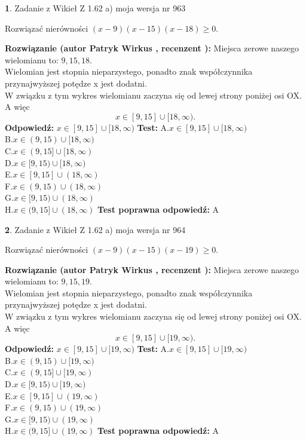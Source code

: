 \documentclass[12pt, a4paper]{article}
\theoremstyle{definition} %
\newtheorem{zad}{}
\newcommand{\zadStart}[1]{\begin{zad}#1\newline}
\newcommand{\zadStop}{\end{zad}}
\newcommand{\rozwStart}[2]{\noindent \textbf{Rozwiązanie (autor #1 , recenzent #2): }\newline}
\newcommand{\rozwStop}{\newline}
\newcommand{\odpStart}{\noindent \textbf{Odpowiedź:}\newline}
\newcommand{\odpStop}{\newline}
\newcommand{\testStart}{\noindent \textbf{Test:}\newline}
\newcommand{\testStop}{\newline}
\newcommand{\kluczStart}{\noindent \textbf{Test poprawna odpowiedź:}\newline}
\newcommand{\kluczStop}{\newline}
\begin{document}
\zadStart{Zadanie z Wikieł Z 1.62 a) moja wersja nr 963}

Rozwiązać nierówności $(x-9)(x-15)(x-18)\ge0$.
\zadStop
\rozwStart{Patryk Wirkus}{}
Miejsca zerowe naszego wielomianu to: $9, 15, 18$.\\
Wielomian jest stopnia nieparzystego, ponadto znak współczynnika przy\linebreak najwyższej potędze x jest dodatni.\\ W związku z tym wykres wielomianu zaczyna się od lewej strony poniżej osi OX. A więc $$x \in [9,15] \cup [18,\infty).$$
\rozwStop
\odpStart
$x \in [9,15] \cup [18,\infty)$
\odpStop
\testStart
A.$x \in [9,15] \cup [18,\infty)$\\
B.$x \in (9,15) \cup [18,\infty)$\\
C.$x \in (9,15] \cup [18,\infty)$\\
D.$x \in [9,15) \cup [18,\infty)$\\
E.$x \in [9,15] \cup (18,\infty)$\\
F.$x \in (9,15) \cup (18,\infty)$\\
G.$x \in [9,15) \cup (18,\infty)$\\
H.$x \in (9,15] \cup (18,\infty)$
\testStop
\kluczStart
A
\kluczStop



\zadStart{Zadanie z Wikieł Z 1.62 a) moja wersja nr 964}

Rozwiązać nierówności $(x-9)(x-15)(x-19)\ge0$.
\zadStop
\rozwStart{Patryk Wirkus}{}
Miejsca zerowe naszego wielomianu to: $9, 15, 19$.\\
Wielomian jest stopnia nieparzystego, ponadto znak współczynnika przy\linebreak najwyższej potędze x jest dodatni.\\ W związku z tym wykres wielomianu zaczyna się od lewej strony poniżej osi OX. A więc $$x \in [9,15] \cup [19,\infty).$$
\rozwStop
\odpStart
$x \in [9,15] \cup [19,\infty)$
\odpStop
\testStart
A.$x \in [9,15] \cup [19,\infty)$\\
B.$x \in (9,15) \cup [19,\infty)$\\
C.$x \in (9,15] \cup [19,\infty)$\\
D.$x \in [9,15) \cup [19,\infty)$\\
E.$x \in [9,15] \cup (19,\infty)$\\
F.$x \in (9,15) \cup (19,\infty)$\\
G.$x \in [9,15) \cup (19,\infty)$\\
H.$x \in (9,15] \cup (19,\infty)$
\testStop
\kluczStart
A
\kluczStop
\end{document}
